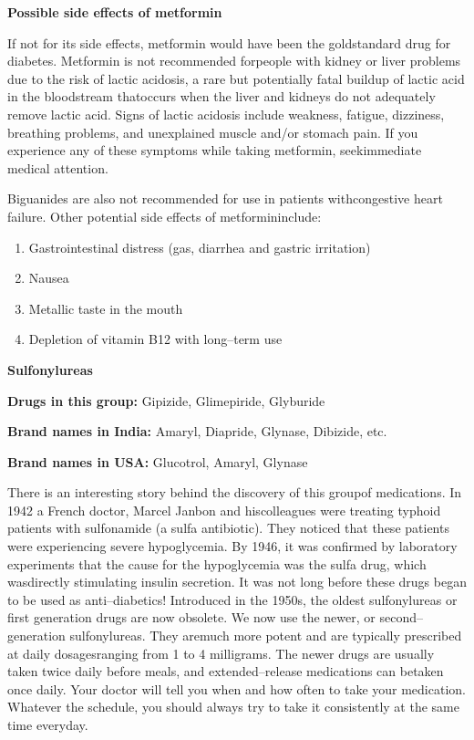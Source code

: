 \clearpage

\noindent\textbf{Possible side effects of metformin}

If not for its side effects, metformin would have been the gold\break standard drug for diabetes. Metformin is not recommended for\break people with kidney or liver problems due to the risk of lactic acidosis, a rare but potentially fatal buildup of lactic acid in the bloodstream that\break occurs when the liver and kidneys do not adequately remove lactic acid. Signs of lactic acidosis include weakness, fatigue, dizziness, brea\-thing problems, and unexplained muscle and/or stomach pain. If you experience any of these symptoms while taking metformin, seek\break immediate medical attention.

Biguanides are also not recommended for use in patients with\break congestive heart failure. Other potential side effects of metformin\break include:

\vspace{-\topsep}
\begin{enumerate}[•]
\itemsep=0pt
\item Gastrointestinal distress (gas, diarrhea and gastric irritation)
\item Nausea
\item Metallic taste in the mouth
\item Depletion of vitamin B12 with long–term use
\end{enumerate}
\vspace{-\topsep}

\textbf{Sulfonylureas}

\textbf{Drugs in this group:} Gipizide, Glimepiride, Glyburide

\textbf{Brand names in India:} Amaryl, Diapride, Glynase, Dibizide, etc.

\textbf{Brand names in USA:} Glucotrol, Amaryl, Glynase

\vskip 3pt

There is an interesting story behind the discovery of this group\break of medications. In 1942 a French doctor, Marcel Janbon and his\break colleagues were treating typhoid patients with sulfonamide (a sulfa anti\-biotic). They noticed that these patients were experiencing severe hypoglycemia. By 1946, it was confirmed by laboratory experiments that the cause for the hypoglycemia was the sulfa drug, which was\break directly stimulating insulin secretion. It was not long before these drugs began to be used as anti–diabetics! Introduced in the 1950s, the oldest sulfonylureas or first generation drugs are now obsolete. We now use the newer, or second–generation sulfonylureas. They are\break much more potent and are typically prescribed at daily dosages\break ranging from 1 to 4 milligrams. The newer drugs are usually taken twice daily before meals, and extended–release medications can be\break taken once daily. Your doctor will tell you when and how often to take your medication. Whatever the schedule, you should always try to take it consistently at the same time everyday.

